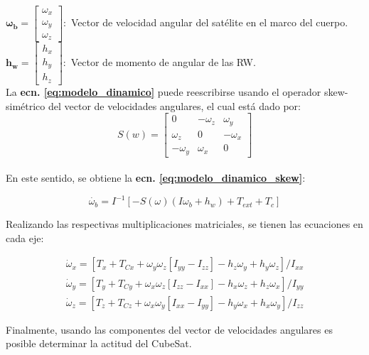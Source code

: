 $\boldsymbol{\omega_b}=\left[\begin{array}{l}\omega_x \\ \omega_y \\ \omega_z\end{array}\right]:$ Vector de velocidad angular del satélite en el marco del cuerpo.\\[5pt]	

$\boldsymbol{h_w}=\left[\begin{array}{l}h_x \\ h_y \\ h_z\end{array}\right]:$ Vector de momento de angular de las RW.\\[10pt]	

La \textbf{ecn. \eqref{eq:modelo_dinamico}} puede reescribirse usando el operador skew-simétrico del vector de velocidades angulares, el cual está dado por:\\[5pt] 
$$
S(w) =\left[\begin{array}{ccc}
	0 & -\omega_z & \omega_y \\
	\omega_z & 0 & -\omega_x \\
	-\omega_y & \omega_x & 0
\end{array}\right]
$$\\[5pt]
En este sentido, se obtiene la \textbf{ecn. \eqref{eq:modelo_dinamico_skew}}:
 
\begin{equation}\label{eq:modelo_dinamico_skew}
	 \dot{\omega_b}=I^{-1}\left[-S(\omega)\left(I \omega_b+h_w\right)+T_{ext}+T_c\right]
\end{equation}


\noindent Realizando las respectivas multiplicaciones matriciales, se tienen las ecuaciones en cada eje:

\begin{gather}	
	\dot{\omega}_x=\left[T_x+T_{C x}+\omega_y \omega_z\left[I_{y y}-I_{z z}\right]-h_z \omega_y+h_y \omega_z\right] / I_{x x}\label{eq:modelo_dinamico_x}\\
	\dot{\omega}_y=\left[T_y+T_{C y}+\omega_x \omega_z\left[I_{z z}-I_{x x}\right]-h_x \omega_z+h_z \omega_x\right] / I_{y y}\label{eq:modelo_dinamico_y}\\
	\dot{\omega}_z=\left[T_z+T_{C z}+\omega_x \omega_y\left[I_{x x}-I_{y y}\right]-h_y \omega_x+h_x \omega_y\right] / I_{z z}
\end{gather}


Finalmente, usando las componentes del vector de velocidades angulares es posible determinar la actitud del CubeSat.

